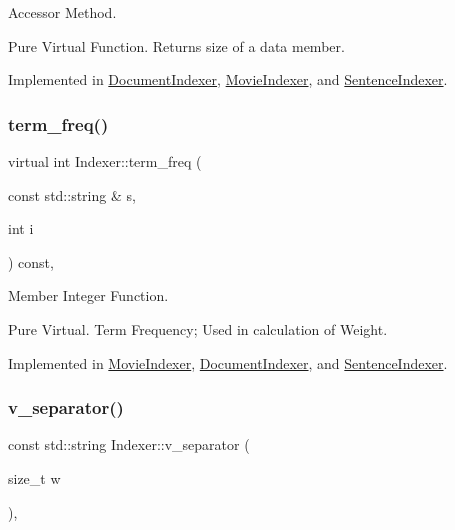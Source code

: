 Accessor Method. 

Pure Virtual Function. Returns size of a data member. 

Implemented in \hyperlink{class_document_indexer_a0c5ab06e1506acc9bbc950e5c563e278}{Document\+Indexer}, \hyperlink{class_movie_indexer_a16a32702b061de5e38110801f80a7bc9}{Movie\+Indexer}, and \hyperlink{class_sentence_indexer_a47409c62e1607ae3919a77080fe240a0}{Sentence\+Indexer}.

\mbox{\label{class_indexer_a96e17172c76abb679e7cd2ff4606ce4a}} 
\subsubsection{\texorpdfstring{term\+\_\+freq()}{term\_freq()}}
{\footnotesize\ttfamily virtual int Indexer\+::term\+\_\+freq (\begin{DoxyParamCaption}\item[{const std\+::string \&}]{s,  }\item[{int}]{i }\end{DoxyParamCaption}) const\hspace{0.3cm}{\ttfamily [protected]}, {}}



Member Integer Function. 

Pure Virtual. Term Frequency; Used in calculation of Weight. 

Implemented in \hyperlink{class_movie_indexer_a4bba45f6f42bbbfb88a5f7d6aa56d0b3}{Movie\+Indexer}, \hyperlink{class_document_indexer_aba9275a0648629cab3772e75519938e8}{Document\+Indexer}, and \hyperlink{class_sentence_indexer_a54f8bbbce9e37c355fe435b26c16f1ac}{Sentence\+Indexer}.

\mbox{\label{class_indexer_ab8eadc78458b58c256a70208ea927d55}} 
\subsubsection{\texorpdfstring{v\+\_\+separator()}{v\_separator()}}
{\footnotesize\ttfamily const std\+::string Indexer\+::v\+\_\+separator (\begin{DoxyParamCaption}\item[{size\+\_\+t}]{w }\end{DoxyParamCaption})\hspace{0.3cm}{\ttfamily [static]}, {\ttfamily [protected]}}


